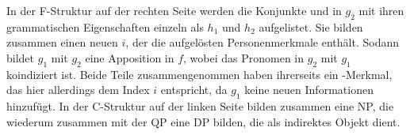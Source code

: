 In der F-Struktur auf der rechten Seite werden die Konjunkte 
 und   in $g_2$ mit ihren grammatischen
Eigenschaften einzeln als $h_1$ und $h_2$ aufgelistet. Sie bilden zusammen
einen neuen \Index{} $i$, der die aufgelösten Personenmerkmale enthält. Sodann
bildet $g_1$ mit $g_2$ eine Apposition in $f$, wobei das Pronomen 
in $g_2$ mit $g_1$ koindiziert ist. Beide Teile zusammengenommen haben
ihrerseits ein \Index-Merkmal, das hier allerdings dem Index $i$ entspricht, da
$g_1$ keine neuen Informationen hinzufügt. In der C-Struktur auf der linken
Seite bilden  zusammen eine NP, die wiederum zusammen mit
der QP  eine DP bilden, die als indirektes Objekt dient.

